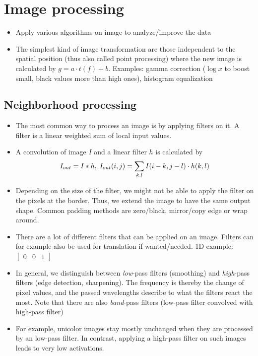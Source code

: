 \section{Image processing}
\begin{itemize}
	\item Apply various algorithms on image to analyze/improve the data
	\item The simplest kind of image transformation are those independent to the spatial position (thus also called point processing) where the new image is calculated by $g=a\cdot t(f)+ b$. Examples: gamma correction ($\log x$ to boost small, black values more than high ones), histogram equalization
\end{itemize}
\subsection{Neighborhood processing}
\begin{itemize}
	\item The most common way to process an image is by applying filters on it. A filter is a linear weighted sum of local input values. 
	\item A convolution of image $I$ and a linear filter $h$ is calculated by $$I_{out} = I \ast h, \hspace{1mm} I_{out}(i,j) = \sum\limits_{k,l} I(i-k, j-l) \cdot h(k,l)$$
	\item Depending on the size of the filter, we might not be able to apply the filter on the pixels at the border. Thus, we extend the image to have the same output shape. Common padding methods are zero/black, mirror/copy edge or wrap around.
	\item There are a lot of different filters that can be applied on an image. Filters can for example also be used for translation if wanted/needed. 1D example: $\left[\begin{array}{ccc}
	0 & 0 & 1
	\end{array}\right]$
	\item In general, we distinguish between \textit{low}-pass filters (smoothing) and \textit{high}-pass filters (edge detection, sharpening). The frequency is thereby the change of pixel values, and the passed wavelengths describe to what the filters react the most. Note that there are also \textit{band}-pass filters (low-pass filter convolved with high-pass filter)
	\item For example, unicolor images stay mostly unchanged when they are processed by an low-pass filter. In contrast, applying a high-pass filter on such images leads to very low activations.
\end{itemize}
